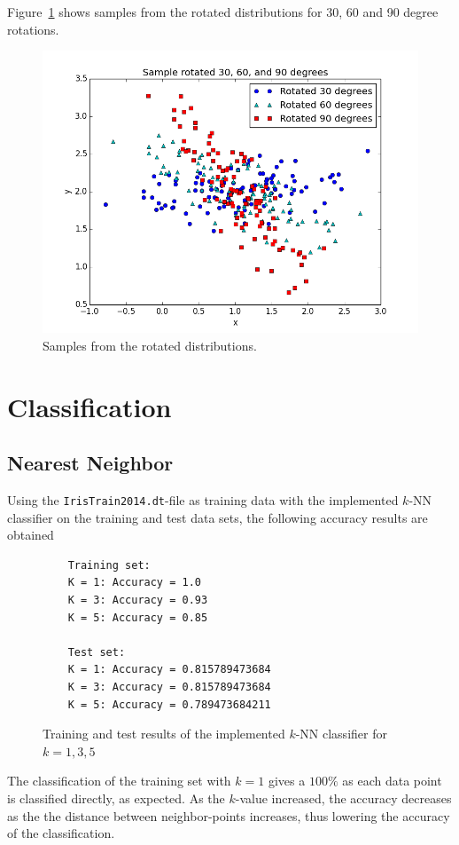 \documentclass[a4paper]{article}
\begin{document}
Figure~\ref{fig:samples_rotated} shows samples from the rotated distributions for 30, 60 and 90 degree rotations.

\begin{figure}[H]
  \centering
  \includegraphics[width=.7\linewidth]{figures/samples_rotated.png}
  \caption{Samples from the rotated distributions.}
  \label{fig:samples_rotated}
\end{figure}

\section{Classification}

\subsection{Nearest Neighbor}
Using the \texttt{IrisTrain2014.dt}-file as training data with the implemented $k$-NN classifier on the training and test data sets, the following accuracy results are obtained
\begin{figure}[H]
	\begin{lstlisting}
	Training set:
	K = 1: Accuracy = 1.0
	K = 3: Accuracy = 0.93
	K = 5: Accuracy = 0.85

	Test set:
	K = 1: Accuracy = 0.815789473684
	K = 3: Accuracy = 0.815789473684
	K = 5: Accuracy = 0.789473684211
	\end{lstlisting}
	\caption{Training and test results of the implemented $k$-NN classifier for $k=1,3,5$}
	\label{fig:k-nn_results}
\end{figure}

The classification of the training set with $k=1$ gives a $100\%$ as each data point is classified directly, as expected. As the $k$-value increased, the accuracy decreases as the the distance between neighbor-points increases, thus lowering the accuracy of the classification.
\end{document}
